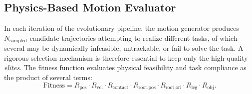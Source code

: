 \documentclass{article}
\begin{document}




\subsection{Physics-Based Motion Evaluator}\label{sec:physics_based_motion_evaluator}

In each iteration of the evolutionary pipeline, the motion generator produces $N_{\text{sampled}}$ candidate trajectories attempting to realize different tasks, of which several may be dynamically infeasible, untrackable, or fail to solve the task. A rigorous selection mechanism is therefore essential to keep only the high-quality \textit{elites}.
The fitness function evaluates physical feasibility and task compliance as the product of several terms:
\begin{equation}
\text{Fitness}
=
R_{\text{pos}}
\cdot R_{\text{vel}}
\cdot R_{\text{contact}}
\cdot R_{\text{root,pos}}
\cdot R_{\text{root,ori}}
\cdot R_{\text{leg}}
\cdot R_{\text{obj}} .
\end{equation}
\end{document}
